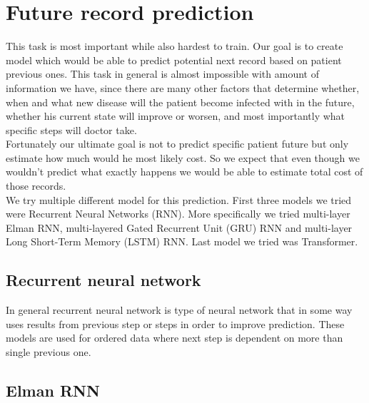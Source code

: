 
\section{Future record prediction}
\label{record_prediction}

This task is most important while also hardest to train. Our goal is to create model which would be able to predict potential next record based on patient previous ones. This task in general is almost impossible with amount of information we have, since there are many other factors that determine whether, when and what new disease will the patient become infected with in the future, whether his current state will improve or worsen, and most importantly what specific steps will doctor take.
\\

Fortunately our ultimate goal is not to predict specific patient future but only estimate how much would he most likely cost. So we expect that even though we wouldn't predict what exactly happens we would be able to estimate total cost of those records.
\\

We try multiple different model for this prediction. First three models we tried were Recurrent Neural Networks (RNN). More specifically we tried multi-layer Elman RNN, multi-layered Gated Recurrent Unit (GRU) RNN and multi-layer Long Short-Term Memory (LSTM) RNN. Last model we tried was Transformer.
\\

\subsection{Recurrent neural network}

In general recurrent neural network is type of neural network that in some way uses results from previous step or steps in order to improve prediction. These models are used for ordered data where next step is dependent on more than single previous one.

\subsection{Elman RNN}

